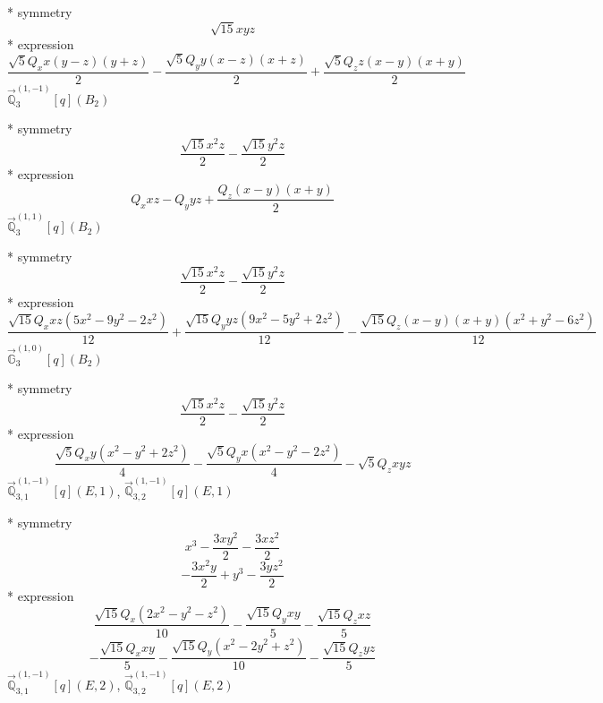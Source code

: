 \documentclass[fleqn,8pt]{jsarticle}
\begin{document}
\noindent\quad ** symmetry
\begin{dmath*}
\sqrt{15} x y z
\end{dmath*}
\noindent\quad ** expression
\begin{dmath*}
\frac{\sqrt{5} Q_{x} x \left(y - z\right) \left(y + z\right)}{2} - \frac{\sqrt{5} Q_{y} y \left(x - z\right) \left(x + z\right)}{2} + \frac{\sqrt{5} Q_{z} z \left(x - y\right) \left(x + y\right)}{2}
\end{dmath*}
\noindent\quad $\vec{\mathbb{Q}}_{3}^{(1,-1)}[q](B_{2})$

\noindent\quad ** symmetry
\begin{dmath*}
\frac{\sqrt{15} x^{2} z}{2} - \frac{\sqrt{15} y^{2} z}{2}
\end{dmath*}
\noindent\quad ** expression
\begin{dmath*}
Q_{x} x z - Q_{y} y z + \frac{Q_{z} \left(x - y\right) \left(x + y\right)}{2}
\end{dmath*}
\noindent\quad $\vec{\mathbb{Q}}_{3}^{(1,1)}[q](B_{2})$

\noindent\quad ** symmetry
\begin{dmath*}
\frac{\sqrt{15} x^{2} z}{2} - \frac{\sqrt{15} y^{2} z}{2}
\end{dmath*}
\noindent\quad ** expression
\begin{dmath*}
\frac{\sqrt{15} Q_{x} x z \left(5 x^{2} - 9 y^{2} - 2 z^{2}\right)}{12} + \frac{\sqrt{15} Q_{y} y z \left(9 x^{2} - 5 y^{2} + 2 z^{2}\right)}{12} - \frac{\sqrt{15} Q_{z} \left(x - y\right) \left(x + y\right) \left(x^{2} + y^{2} - 6 z^{2}\right)}{12}
\end{dmath*}
\noindent\quad $\vec{\mathbb{G}}_{3}^{(1,0)}[q](B_{2})$

\noindent\quad ** symmetry
\begin{dmath*}
\frac{\sqrt{15} x^{2} z}{2} - \frac{\sqrt{15} y^{2} z}{2}
\end{dmath*}
\noindent\quad ** expression
\begin{dmath*}
\frac{\sqrt{5} Q_{x} y \left(x^{2} - y^{2} + 2 z^{2}\right)}{4} - \frac{\sqrt{5} Q_{y} x \left(x^{2} - y^{2} - 2 z^{2}\right)}{4} - \sqrt{5} Q_{z} x y z
\end{dmath*}
\noindent\quad $\vec{\mathbb{Q}}_{3,1}^{(1,-1)}[q](E,1)$, $\vec{\mathbb{Q}}_{3,2}^{(1,-1)}[q](E,1)$

\noindent\quad ** symmetry
\begin{dmath*}
x^{3} - \frac{3 x y^{2}}{2} - \frac{3 x z^{2}}{2}
\end{dmath*}
\begin{dmath*}
- \frac{3 x^{2} y}{2} + y^{3} - \frac{3 y z^{2}}{2}
\end{dmath*}
\noindent\quad ** expression
\begin{dmath*}
\frac{\sqrt{15} Q_{x} \left(2 x^{2} - y^{2} - z^{2}\right)}{10} - \frac{\sqrt{15} Q_{y} x y}{5} - \frac{\sqrt{15} Q_{z} x z}{5}
\end{dmath*}
\begin{dmath*}
- \frac{\sqrt{15} Q_{x} x y}{5} - \frac{\sqrt{15} Q_{y} \left(x^{2} - 2 y^{2} + z^{2}\right)}{10} - \frac{\sqrt{15} Q_{z} y z}{5}
\end{dmath*}
\noindent\quad $\vec{\mathbb{Q}}_{3,1}^{(1,-1)}[q](E,2)$, $\vec{\mathbb{Q}}_{3,2}^{(1,-1)}[q](E,2)$
\end{document}
